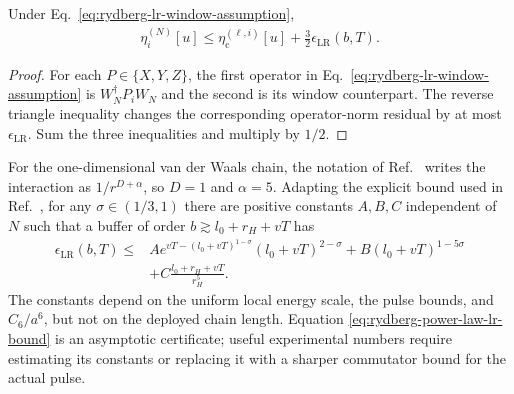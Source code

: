 \begin{proposition}
\label{prop:window-transfer}
Under Eq.~\eqref{eq:rydberg-lr-window-assumption},
\begin{align}
\eta_i^{(N)}[u]
\leq \eta_{\mathrm c}^{(\ell,i)}[u]
+\frac{3}{2}\epsilon_{\mathrm{LR}}(b,T).
\label{eq:window-transfer-bound}
\end{align}
\end{proposition}

\begin{proof}
For each $P\in\{X,Y,Z\}$, the first operator in
Eq.~\eqref{eq:rydberg-lr-window-assumption} is
$W_N^\dagger P_iW_N$ and the second is its window counterpart.  The reverse
triangle inequality changes the corresponding operator-norm residual by at
most $\epsilon_{\mathrm{LR}}$.  Sum the three inequalities and multiply by
$1/2$.
\end{proof}

For the one-dimensional van der Waals chain, the notation of
Ref.~\cite{else_2020_improved} writes the interaction as
$1/r^{D+\alpha}$, so $D=1$ and $\alpha=5$.  Adapting the explicit bound used
in Ref.~\cite{mizuta_2022_local}, for any $\sigma\in(1/3,1)$ there are
positive constants $A,B,C$ independent of $N$ such that a buffer of order
$b\gtrsim l_0+r_H+vT$ has
\begin{align}
\epsilon_{\mathrm{LR}}(b,T)
\leq{}&
A e^{vT-(l_0+vT)^{1-\sigma}}(l_0+vT)^{2-\sigma}
+B(l_0+vT)^{1-5\sigma}
\nonumber\\
&+C\frac{l_0+r_H+vT}{r_H^5}.
\label{eq:rydberg-power-law-lr-bound}
\end{align}
The constants depend on the uniform local energy scale, the pulse bounds, and
$C_6/a^6$, but not on the deployed chain length.  Equation
\eqref{eq:rydberg-power-law-lr-bound} is an asymptotic certificate; useful
experimental numbers require estimating its constants or replacing it with a
sharper commutator bound for the actual pulse.

